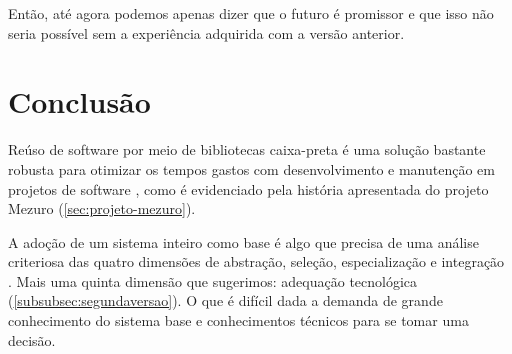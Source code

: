 \documentclass[12pt]{article}
\begin{document}
    Então, até agora podemos apenas dizer que o futuro é promissor e que isso não seria possível sem a experiência adquirida com a versão anterior.

\section{Conclusão} \label{sec:conclusao}
Reúso de software por meio de bibliotecas caixa-preta é uma solução bastante robusta para otimizar os tempos gastos com desenvolvimento e manutenção em projetos de software \cite{hdghi11}, como é evidenciado pela história apresentada do projeto Mezuro (\ref{sec:projeto-mezuro}).

A adoção de um sistema inteiro como base é algo que precisa de uma análise criteriosa das quatro dimensões de abstração, seleção, especialização e integração \cite{k92}. Mais uma quinta dimensão que sugerimos: adequação tecnológica (\ref{subsubsec:segundaversao}). O que é difícil dada a demanda de grande conhecimento do sistema base e conhecimentos técnicos para se tomar uma decisão.

\newpage


\end{document}
